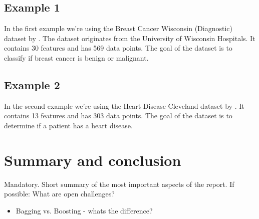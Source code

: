 \subsection{Example 1}
In the first example we're using the Breast Cancer Wisconsin (Diagnostic)
dataset by \citet*{breast_cancer_wisconsin}. The dataset originates from
the University of Wisconsin Hospitals. It contains 30 features and has 569
data points. The goal of the dataset is to classify if breast cancer
is benign or malignant.
\newpage



\subsection{Example 2}
In the second example we're using the Heart Disease Cleveland dataset by
\citet*{heart_disease_cleveland}. It contains 13 features and has 303 data 
points. The goal of the dataset is to determine if a patient has a heart
disease.



\section{Summary and conclusion}
Mandatory. Short summary of the most important aspects of the report.
If possible: What are open challenges?

\begin{itemize}
    \item Bagging vs. Boosting - whats the difference?
\end{itemize}
